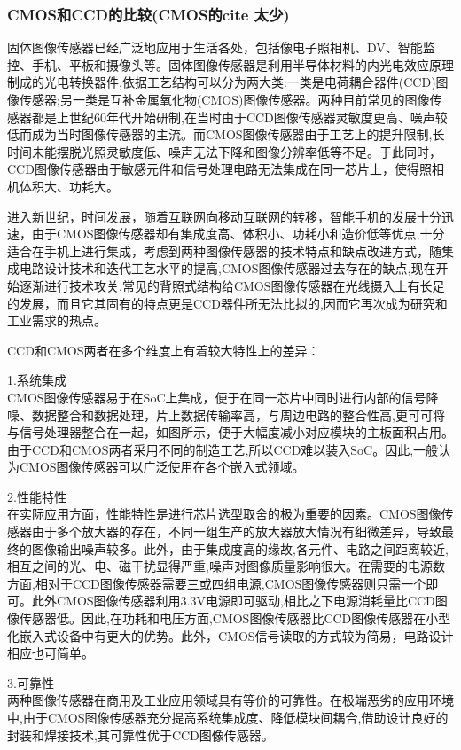 \subsubsection{CMOS和CCD的比较(CMOS的cite 太少)}
固体图像传感器已经广泛地应用于生活各处，包括像电子照相机、DV、智能监控、手机、平板和摄像头等。固体图像传感器是利用半导体材料的内光电效应原理制成的光电转换器件,依据工艺结构可以分为两大类:一类是电荷耦合器件(CCD)图像传感器;另一类是互补金属氧化物(CMOS)图像传感器。两种目前常见的图像传感器都是上世纪60年代开始研制,在当时由于CCD图像传感器灵敏度更高、噪声较低而成为当时图像传感器的主流。而CMOS图像传感器由于工艺上的提升限制,长时间未能摆脱光照灵敏度低、噪声无法下降和图像分辨率低等不足。于此同时，CCD图像传感器由于敏感元件和信号处理电路无法集成在同一芯片上，使得照相机体积大、功耗大。\cite{CCDCMOSf}

进入新世纪，时间发展，随着互联网向移动互联网的转移，智能手机的发展十分迅速，由于CMOS图像传感器却有集成度高、体积小、功耗小和造价低等优点,十分适合在手机上进行集成，考虑到两种图像传感器的技术特点和缺点改进方式，随集成电路设计技术和迭代工艺水平的提高,CMOS图像传感器过去存在的缺点,现在开始逐渐进行技术攻关,常见的背照式结构给CMOS图像传感器在光线摄入上有长足的发展，而且它其固有的特点更是CCD器件所无法比拟的,因而它再次成为研究和工业需求的热点。

CCD和CMOS两者在多个维度上有着较大特性上的差异：

1.系统集成 \\
CMOS图像传感器易于在SoC上集成，便于在同一芯片中同时进行内部的信号降噪、数据整合和数据处理，片上数据传输率高，与周边电路的整合性高,更可可将与信号处理器整合在一起，如图所示，便于大幅度减小对应模块的主板面积占用。由于CCD和CMOS两者采用不同的制造工艺,所以CCD难以装入SoC。因此,一般认为CMOS图像传感器可以广泛使用在各个嵌入式领域。

2.性能特性\\
在实际应用方面，性能特性是进行芯片选型取舍的极为重要的因素。CMOS图像传感器由于多个放大器的存在，不同一组生产的放大器放大情况有细微差异，导致最终的图像输出噪声较多。此外，由于集成度高的缘故,各元件、电路之间距离较近,相互之间的光、电、磁干扰显得严重,噪声对图像质量影响很大。在需要的电源数方面,相对于CCD图像传感器需要三或四组电源,CMOS图像传感器则只需一个即可。此外CMOS图像传感器利用3.3V电源即可驱动,相比之下电源消耗量比CCD图像传感器低。因此,在功耗和电压方面,CMOS图像传感器比CCD图像传感器在小型化嵌入式设备中有更大的优势。此外，CMOS信号读取的方式较为简易，电路设计相应也可简单。

3.可靠性\\
两种图像传感器在商用及工业应用领域具有等价的可靠性。在极端恶劣的应用环境中,由于CMOS图像传感器充分提高系统集成度、降低模块间耦合,借助设计良好的封装和焊接技术,其可靠性优于CCD图像传感器。

